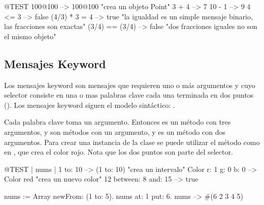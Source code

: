 \documentclass[a4paper,10pt,twoside]{book}
\begin{document}
\begin{code}{@TEST}
100@100      --> 100@100  "crea un objeto Point"
3 + 4              --> 7
10 - 1            --> 9
4 <= 3            --> false
(4/3) * 3 = 4   --> true  "la igualdad es un simple mensaje binario, las fracciones son exactas"
(3/4) == (3/4) --> false  "dos fracciones iguales no son el mismo objeto"
\end{code}


\subsection{Mensajes Keyword} 

Los mensajes keyword son mensajes que requieren uno o m\'as argumentos y cuyo selector consiste en una o mas palabras clave cada una terminada en dos puntos (\ct{:}). Los mensajes keyword siguen el modelo sint\'actico:  .

Cada palabra clave toma un argumento. Entonces  es un m\'etodo con tres argumentos,  y  son m\'etodos con un argumento, y  es un m\'etodo con dos argumentos. Para crear una instancia de la clase  se puede utilizar el m\'etodo  como en , que crea el color rojo. Nota que los dos puntos son parte del selector.


\begin{code}{@TEST | nums |}
1 to: 10                        --> (1 to: 10)  "crea un intervalo"
Color r: 1 g: 0 b: 0       --> Color red  "crea un nuevo color"
12 between: 8 and: 15 --> true

nums := Array newFrom: (1 to: 5).
nums at: 1 put: 6.
nums --> #(6 2 3 4 5)
\end{code}
\end{document}
